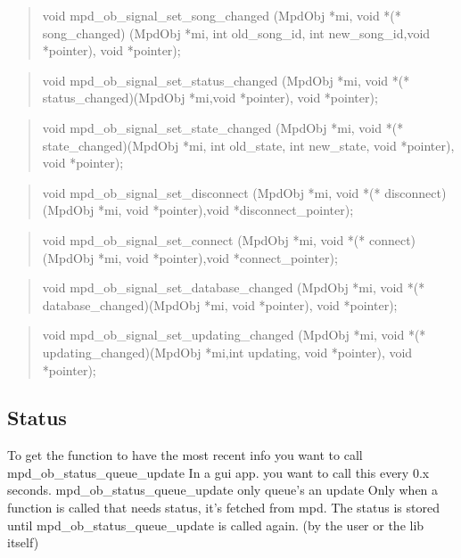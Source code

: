 \documentclass[a4paper,11pt]{article}
\begin{document}
	\begin{quote}
	void   mpd\_ob\_signal\_set\_song\_changed  
	(MpdObj *mi, void *(* song\_changed)
	(MpdObj *mi, int old\_song\_id, int new\_song\_id,void *pointer), 
	void *pointer);
	\end{quote}
	
	\begin{quote}
	void   mpd\_ob\_signal\_set\_status\_changed 
	(MpdObj *mi, void *(* status\_changed)(MpdObj *mi,void *pointer), void *pointer);
	\end{quote}
	
	\begin{quote}
	void   mpd\_ob\_signal\_set\_state\_changed  
	(MpdObj *mi, void *(* state\_changed)(MpdObj *mi, int old\_state, int new\_state, void *pointer),
	void *pointer);
	\end{quote}
	
	\begin{quote}
	void   mpd\_ob\_signal\_set\_disconnect  
	(MpdObj *mi, void *(* disconnect)(MpdObj *mi, void *pointer),void *disconnect\_pointer);
	
	\end{quote}
	
	\begin{quote}
	void   mpd\_ob\_signal\_set\_connect  
	(MpdObj *mi, void *(* connect)(MpdObj *mi, void *pointer),void *connect\_pointer);
	\end{quote}
	
	\begin{quote}
	void   mpd\_ob\_signal\_set\_database\_changed 
	(MpdObj *mi, void *(* database\_changed)(MpdObj *mi, void *pointer), void *pointer);
	\end{quote}
	
	\begin{quote}
	void   mpd\_ob\_signal\_set\_updating\_changed 
	(MpdObj *mi, void *(* updating\_changed)(MpdObj *mi,int updating, void *pointer), 
	void *pointer);
	\end{quote}
	
	
	
	\subsection{Status}
	
	
	To get the function to have the  most recent info you want to call mpd\_ob\_status\_queue\_update 
	In a gui app. you want to call this every 0.x seconds. 
	mpd\_ob\_status\_queue\_update only queue's an update
	Only when a function is called that needs status, it's fetched from mpd.
	The status is stored until mpd\_ob\_status\_queue\_update is called again. (by the user or the lib itself)
	
\end{document}

